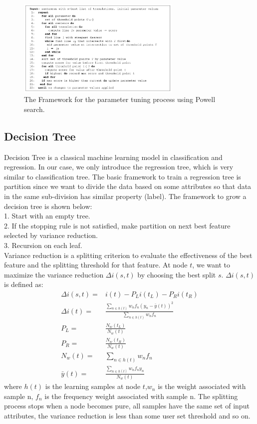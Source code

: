 \begin{figure}[!htb]
  \centering
  \includegraphics[width=0.7\textwidth]{MERT/mert.png}
  \caption{The Framework for the parameter tuning process using Powell search.
}
    \label{mert1}
\end{figure}

\subsection{Decision Tree}

Decision Tree is a classical machine learning model in classification and regression. In our case, we only introduce the regression tree, which is very similar to classification tree. The basic framework to train a regression tree is partition since we want to divide the data based on some attributes so that data in the same sub-division has similar property (label).  The framework to grow a decision tree is shown below:\\
1. Start with an empty tree.\\
2. If the stopping rule is not satisfied, make partition on next best feature selected by variance reduction.\\
3. Recursion on each leaf.\\
Variance reduction is a splitting criterion to evaluate the effectiveness of the best feature and the splitting threshold for that feature. At node $t$, we want to maximize the variance reduction $\Delta i(s,t)$ by choosing the best split $s$. $\Delta i(s,t)$ is defined as:
\begin{align}
\Delta i(s,t) =& i(t) - P_L i(t_L)-P_Ri(t_R)\\
\Delta i(t) = & \frac{\sum_{n \in h(t)} w_n f_n (y_n - \bar{y}(t))^2}{\sum_{n \in h(t)} w_n f_n}\\
P_L = & \frac{ N_w(t_L)}{N_w (t)}\\
P_R = & \frac{ N_w(t_R)}{N_w (t)}\\
N_w(t) = & \sum_{n \in h(t)} w_n f_n\\
\bar{y}(t) = & \frac{\sum_{n \in h(t)} w_n f_n y_n}{N_w (t)}
\end{align}
where $h(t)$ is the learning samples at node $t$,$w_n$ is the weight associated with sample n, $f_n$ is the frequency weight associated with sample n. The splitting process stops when a node becomes pure, all samples have the same set of input attributes, the variance reduction is less than some user set threshold and so on.

